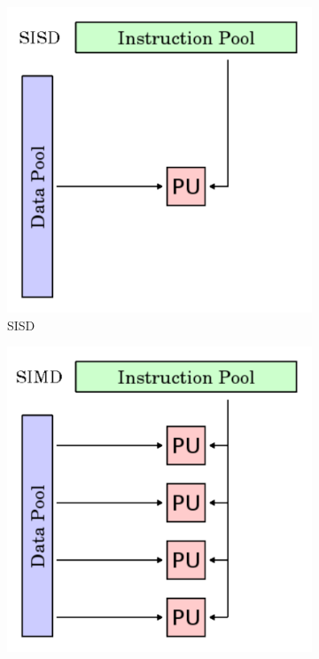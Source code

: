 \documentclass[a4paper, 11pt]{report}
\begin{document}
\begin{figure}[ht]
	\centering
	\begin{subfigure}[t]{0.4\textwidth}
		\centering
		\includegraphics[scale=.3]{images/sisd.pdf}
		\caption{SISD}\label{fig:sisd}
	\end{subfigure}
	\begin{subfigure}[t]{0.4\textwidth}
		\centering
		\includegraphics[scale=.3]{images/simd.pdf}

\end{subfigure}
\end{figure}
\end{document}
